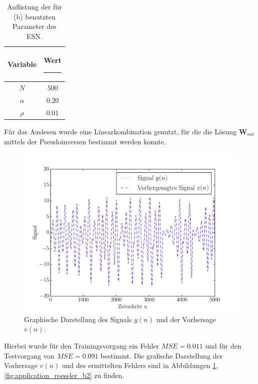 \begin{table}[H]
	\centering
		\begin{tabular}{|c|c|}
		\rule[-1ex]{0pt}{4.5ex} Variable & \hspace{4ex} Wert \rule[-1ex]{4ex}{0pt}\\ 
		\hline \hline 
		\rule[-1ex]{0pt}{4.5ex} $N$ & $500$ \\ 
		\hline 
		\rule[-1ex]{0pt}{4.5ex} $\alpha$ & $0.20$ \\ 
		\hline 
		\rule[-1ex]{0pt}{4.5ex} $\rho$ & $0.01$ \\ 
		\hline 
	\end{tabular} 
	\caption{Auflistung der für (b) benutzten Parameter des \textsc{ESN}.}
\label{tab:application_roessler_b}
\end{table}

Für das Auslesen wurde eine Linearkombination genutzt, für die die Lösung $\mathbf{W}_{out}$ mittels der Pseudoinversen bestimmt werden konnte.

\begin{figure}[H]
    \centering
     \includegraphics[width = 0.9 \textwidth]{figures/roessler_cross_pred.pdf}
    \caption{Graphische Darstellung des Signals $y(n)$ und der Vorhersage $v(n)$.}
    \label{fig:application_roessler_b1}
\end{figure}

Hierbei wurde für den Trainingsvorgang ein Fehler $MSE = 0.011$ und für den Testvorgang von $MSE = 0.091$ bestimmt. Die grafische Darstellung der Vorhersage $v(n)$ und des ermittelten Fehlers sind in Abbildungen \ref{fig:application_roessler_b1}, \ref{fig:application_roessler_b2} zu finden.

